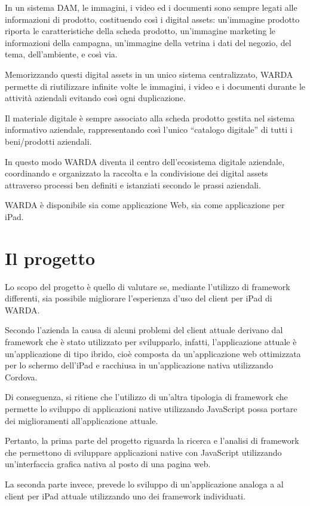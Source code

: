 In un sistema DAM, le immagini, i video ed i documenti sono sempre legati alle informazioni di prodotto, costituendo così i digital assets: un'immagine prodotto riporta le caratteristiche della scheda prodotto, un'immagine marketing le informazioni della campagna, un'immagine della vetrina i dati del negozio, del tema, dell'ambiente, e così via.

Memorizzando questi digital assets in un unico sistema centralizzato, WARDA permette di riutilizzare infinite volte le immagini, i video e i documenti durante le attività aziendali evitando così ogni duplicazione. 

Il materiale digitale è sempre associato alla scheda prodotto gestita nel sistema informativo aziendale, rappresentando così l'unico ``catalogo digitale'' di tutti i beni/prodotti aziendali.

In questo modo WARDA diventa il centro dell'ecosistema digitale aziendale, coordinando e organizzato la raccolta e la condivisione dei digital assets attraverso processi ben definiti e istanziati secondo le prassi aziendali.

WARDA è disponibile sia come applicazione Web, sia come applicazione per iPad.

\section{Il progetto}
Lo scopo del progetto è quello di valutare se, mediante l'utilizzo di framework differenti, sia possibile migliorare l'esperienza d'uso del client per iPad di WARDA.

Secondo l'azienda la causa di alcuni problemi del client attuale derivano dal framework che è stato utilizzato per svilupparlo, infatti, l'applicazione attuale è un'applicazione di tipo ibrido, cioè composta da un'applicazione web ottimizzata per lo schermo dell'iPad e racchiusa in un'applicazione nativa utilizzando \gls{Cordova}.

Di conseguenza, si ritiene che l'utilizzo di un'altra tipologia di framework che permette lo sviluppo di applicazioni native utilizzando JavaScript possa portare dei miglioramenti all'applicazione attuale.

Pertanto, la prima parte del progetto riguarda la ricerca e l'analisi di framework che permettono di sviluppare applicazioni native con JavaScript utilizzando un'interfaccia grafica nativa al posto di una pagina web.

La seconda parte invece, prevede lo sviluppo di un'applicazione analoga a al client per iPad attuale utilizzando uno dei framework individuati.
